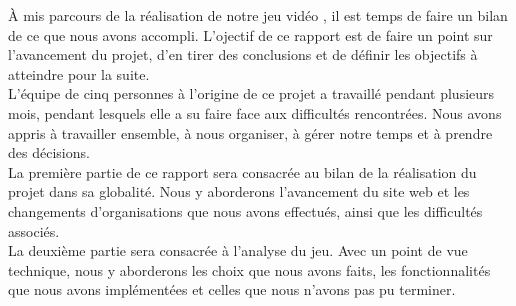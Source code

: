 
À mis parcours de la réalisation de notre jeu vidéo \gameName, il est temps de faire un bilan de ce que nous avons accompli.
L'ojectif de ce rapport est de faire un point sur l'avancement du projet, d'en tirer des conclusions et de définir les objectifs à atteindre pour la suite.
\\

L'équipe de cinq personnes à l'origine de ce projet a travaillé pendant plusieurs mois, pendant lesquels elle a su faire face aux difficultés rencontrées. 
Nous avons appris à travailler ensemble, à nous organiser, à gérer notre temps et à prendre des décisions. 
\\

La première partie de ce rapport sera consacrée au bilan de la réalisation du projet dans sa globalité. 
Nous y aborderons l'avancement du site web et les changements d'organisations que nous avons effectués, ainsi que les difficultés associés.
\\

La deuxième partie sera consacrée à l'analyse du jeu. 
Avec un point de vue technique, nous y aborderons les choix que nous avons faits, les fonctionnalités que nous avons implémentées et celles que nous n'avons pas pu terminer.
